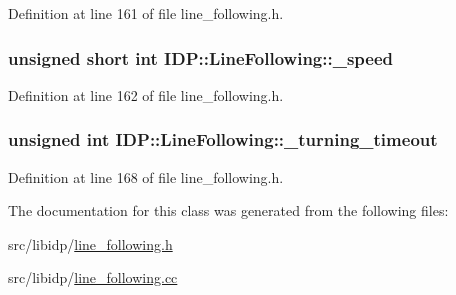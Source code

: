 Definition at line 161 of file line\_\-following.h.

\hypertarget{classIDP_1_1LineFollowing_a67d4ac53d4cd8fa53d6b61ec839ce8bc}{
\subsubsection[{\_\-speed}]{\setlength{\rightskip}{0pt plus 5cm}unsigned short int {\bf IDP::LineFollowing::\_\-speed}}}
\label{classIDP_1_1LineFollowing_a67d4ac53d4cd8fa53d6b61ec839ce8bc}


Definition at line 162 of file line\_\-following.h.

\hypertarget{classIDP_1_1LineFollowing_a2b929e24688cbc116b1f95b295cbc914}{
\subsubsection[{\_\-turning\_\-timeout}]{\setlength{\rightskip}{0pt plus 5cm}unsigned int {\bf IDP::LineFollowing::\_\-turning\_\-timeout}}}
\label{classIDP_1_1LineFollowing_a2b929e24688cbc116b1f95b295cbc914}


Definition at line 168 of file line\_\-following.h.



The documentation for this class was generated from the following files:\begin{DoxyCompactItemize}
\item 
src/libidp/\hyperlink{line__following_8h}{line\_\-following.h}\item 
src/libidp/\hyperlink{line__following_8cc}{line\_\-following.cc}\end{DoxyCompactItemize}
